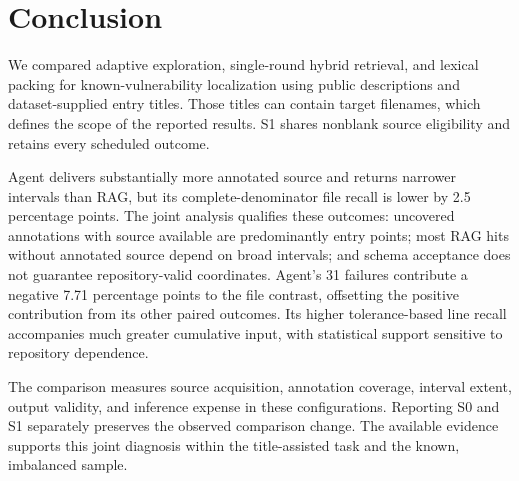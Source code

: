 \section{Conclusion}
We compared adaptive exploration, single-round hybrid retrieval, and lexical packing for known-vulnerability localization using public descriptions and dataset-supplied entry titles. Those titles can contain target filenames, which defines the scope of the reported results. S1 shares nonblank source eligibility and retains every scheduled outcome.

Agent delivers substantially more annotated source and returns narrower intervals than RAG, but its complete-denominator file recall is lower by 2.5 percentage points. The joint analysis qualifies these outcomes: uncovered annotations with source available are predominantly entry points; most RAG hits without annotated source depend on broad intervals; and schema acceptance does not guarantee repository-valid coordinates. Agent's 31 failures contribute a negative 7.71 percentage points to the file contrast, offsetting the positive contribution from its other paired outcomes. Its higher tolerance-based line recall accompanies much greater cumulative input, with statistical support sensitive to repository dependence.

The comparison measures source acquisition, annotation coverage, interval extent, output validity, and inference expense in these configurations. Reporting S0 and S1 separately preserves the observed comparison change. The available evidence supports this joint diagnosis within the title-assisted task and the known, imbalanced sample.
